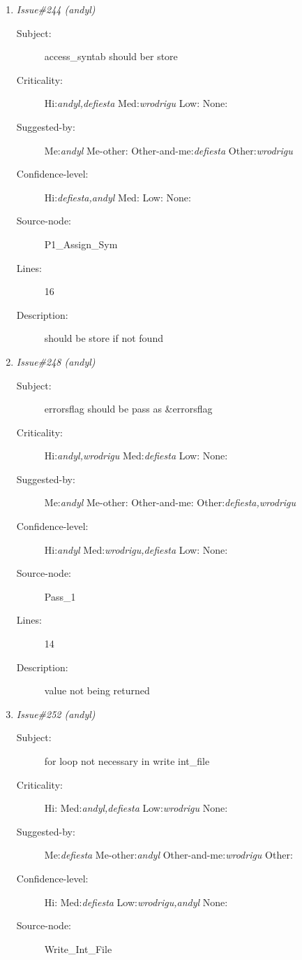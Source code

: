 \begin{enumerate}
\begin{description}
\item [Lines:] 28

\item [Description:] incorrect newlocctr
\end{description}
\item {\it Issue\#244 (andyl)}
\begin{description}
\item [Subject:] access\_syntab should ber store
\item [Criticality:] Hi:{\it andyl,defiesta} Med:{\it wrodrigu} Low:{\it } None:{\it }
\item [Suggested-by:] Me:{\it andyl} Me-other:{\it } Other-and-me:{\it defiesta} Other:{\it wrodrigu}
\item [Confidence-level:] Hi:{\it defiesta,andyl} Med:{\it } Low:{\it } None:{\it }
\item [Source-node:] P1\_Assign\_Sym

\item [Lines:] 16

\item [Description:] should be store if not found
\end{description}
\item {\it Issue\#248 (andyl)}
\begin{description}
\item [Subject:] errorsflag should be pass as \&errorsflag
\item [Criticality:] Hi:{\it andyl,wrodrigu} Med:{\it defiesta} Low:{\it } None:{\it }
\item [Suggested-by:] Me:{\it andyl} Me-other:{\it } Other-and-me:{\it } Other:{\it defiesta,wrodrigu}
\item [Confidence-level:] Hi:{\it andyl} Med:{\it wrodrigu,defiesta} Low:{\it } None:{\it }
\item [Source-node:] Pass\_1

\item [Lines:] 14

\item [Description:] value not being returned
\end{description}
\item {\it Issue\#252 (andyl)}
\begin{description}
\item [Subject:] for loop not necessary in write int\_file
\item [Criticality:] Hi:{\it } Med:{\it andyl,defiesta} Low:{\it wrodrigu} None:{\it }
\item [Suggested-by:] Me:{\it defiesta} Me-other:{\it andyl} Other-and-me:{\it wrodrigu} Other:{\it }
\item [Confidence-level:] Hi:{\it } Med:{\it defiesta} Low:{\it wrodrigu,andyl} None:{\it }
\item [Source-node:] Write\_Int\_File


\end{description}
\end{enumerate}
